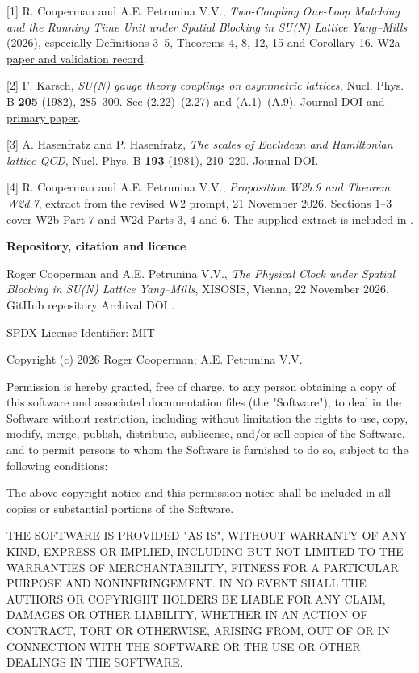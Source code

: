 \documentclass[11pt,a4paper]{article}
\newcommand{\Title}[1]{\par{\raggedright\sffamily\bfseries\color{ink}\fontsize{22}{26}\selectfont #1\par}\vspace{3pt}}
\newcommand{\Section}[1]{\par\addvspace{6pt}{\sffamily\bfseries\color{teal}\large #1\par}\nobreak\vspace{1pt}}
\newcommand{\code}[1]{\texttt{\detokenize{#1}}}
\begin{document}
[1] R. Cooperman and A.E. Petrunina V.V., \emph{Two-Coupling One-Loop Matching and the Running Time Unit under Spatial Blocking in SU(N) Lattice Yang--Mills} (2026), especially Definitions 3--5, Theorems 4, 8, 12, 15 and Corollary 16. \href{https://doi.org/10.5281/zenodo.24395118}{W2a paper and validation record}.

[2] F. Karsch, \emph{SU(N) gauge theory couplings on asymmetric lattices}, Nucl. Phys. B \textbf{205} (1982), 285--300. See (2.22)--(2.27) and (A.1)--(A.9). \href{https://doi.org/10.1016/0550-3213(82)90390-X}{Journal DOI} and \href{https://noah.nrw/ubbihs/download/pdf/5114815}{primary paper}.

[3] A. Hasenfratz and P. Hasenfratz, \emph{The scales of Euclidean and Hamiltonian lattice QCD}, Nucl. Phys. B \textbf{193} (1981), 210--220. \href{https://doi.org/10.1016/0550-3213(81)90526-5}{Journal DOI}.

[4] R. Cooperman and A.E. Petrunina V.V., \emph{Proposition W2b.9 and Theorem W2d.7}, extract from the revised W2 prompt, 21 November 2026. Sections 1--3 cover W2b Part 7 and W2d Parts 3, 4 and 6. The supplied extract is included in \code{report/references/}.
\clearpage
\Title{Repository, citation and licence}
Roger Cooperman and A.E. Petrunina V.V., \emph{The Physical Clock under Spatial Blocking in SU(N) Lattice Yang--Mills}, XISOSIS, Vienna, 22 November 2026.\\
GitHub repository \code{[GITHUB_URL]} \quad Archival DOI \code{[DOI]}.
\Section{MIT License}
SPDX-License-Identifier: MIT

Copyright (c) 2026 Roger Cooperman; A.E. Petrunina V.V.

Permission is hereby granted, free of charge, to any person obtaining a copy of this software and associated documentation files (the "Software"), to deal in the Software without restriction, including without limitation the rights to use, copy, modify, merge, publish, distribute, sublicense, and/or sell copies of the Software, and to permit persons to whom the Software is furnished to do so, subject to the following conditions:

The above copyright notice and this permission notice shall be included in all copies or substantial portions of the Software.

THE SOFTWARE IS PROVIDED "AS IS", WITHOUT WARRANTY OF ANY KIND, EXPRESS OR IMPLIED, INCLUDING BUT NOT LIMITED TO THE WARRANTIES OF MERCHANTABILITY, FITNESS FOR A PARTICULAR PURPOSE AND NONINFRINGEMENT. IN NO EVENT SHALL THE AUTHORS OR COPYRIGHT HOLDERS BE LIABLE FOR ANY CLAIM, DAMAGES OR OTHER LIABILITY, WHETHER IN AN ACTION OF CONTRACT, TORT OR OTHERWISE, ARISING FROM, OUT OF OR IN CONNECTION WITH THE SOFTWARE OR THE USE OR OTHER DEALINGS IN THE SOFTWARE.
\end{document}
